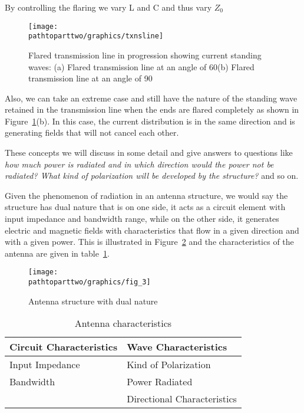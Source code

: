 By controlling the flaring we vary L and C and thus vary $Z_0$
\begin{figure}[h]
\centering
\texttt{[image: \\pathtoparttwo/graphics/txnsline]}
\caption{Flared transmission line in progression showing current standing waves: (a) Flared transmission line at an angle of 60\textdegree (b) Flared transmission line at an angle of 90\textdegree}
\label{fig:flaredtxnsline}
\end{figure}

Also, we can take an extreme case and still have the nature of the standing wave retained in the transmission line when the ends are flared completely as shown in Figure~\ref{fig:flaredtxnsline}(b). In this case, the current distribution is in the same direction and is generating fields that will not cancel each other.

These concepts we will discuss in some detail and give answers to questions like \emph{how much power is radiated and in which direction would the power not be radiated? What kind of polarization will be developed by the structure?} and so on.

Given the phenomenon of radiation in an antenna structure, we would say the structure has dual nature that is on one side, it acts as a circuit element with input impedance and bandwidth range, while on the other side, it generates electric and magnetic fields with characteristics that flow in a given direction and with a given power. This is illustrated in Figure~\ref{fig:antennadualnature} and the characteristics of the antenna are given in table~\ref{tab:antennachar}.
\begin{figure}[h]
\centering
\texttt{[image: \\pathtoparttwo/graphics/fig\_3]}
\caption{Antenna structure with dual nature}
\label{fig:antennadualnature}
\end{figure}
\begin{table}[h]
\centering
\caption{Antenna characteristics}
\begin{tabular}{|l|l|}
\hline
\textbf{Circuit Characteristics} & \textbf{Wave Characteristics} \\
\hline
Input Impedance & Kind of Polarization \\
\hline
Bandwidth & Power Radiated \\
\hline
  & Directional Characteristics \\
\hline
\end{tabular}
\label{tab:antennachar}
\end{table}


